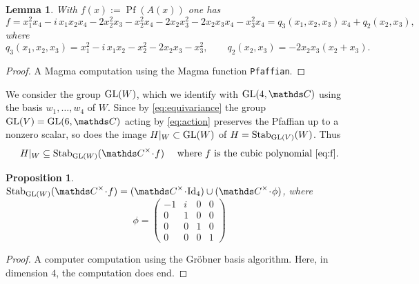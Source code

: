 \documentclass[11pt]{amsart}
\theoremstyle{plain}
\newtheorem{proposition}[theorem]{Proposition}
\newtheorem{lemma}[theorem]{Lemma}
\theoremstyle{definition}
\newcommand{\C}{{\mathds C}}
\newcommand{\GL}{{\rm GL}}
\newcommand{\Stab}{{\rm Stab}}
\newcommand{\Id}{{\rm Id}}
\newcommand{\PP}{\mathbb{P}}
\newcommand{\Pf}{\operatorname{Pf}}
\newcommand{\scdot}{\!\cdot\!}
\begin{document}
\begin{lemma}\label{lem:cubic}
With $f(x):=\Pf(A(x))$ one has
\begin{equation}\label{eq:f}
f=x_1^2x_4-i\,x_1x_2x_4-2x_2^2x_3-x_2^2x_4-2x_2x_3^2-2x_2x_3x_4-x_3^2x_4
=q_3(x_1,x_2,x_3)\,x_4+q_2(x_2,x_3),
\end{equation}
where
\begin{equation}\label{eq:qc}
q_3(x_1,x_2,x_3)=x_1^2-i\,x_1x_2-x_2^2-2x_2x_3-x_3^2,\qquad
q_2(x_2,x_3)=-2x_2x_3(x_2+x_3).
\end{equation}
\end{lemma}

\begin{proof}
A Magma computation using the Magma function {\tt Pfaffian}.
\end{proof}

We consider the group $\GL(W)$, which we identify with $\GL(4,\C)$
using the basis $w_1,\dots,w_4$ of $W$.
Since by \eqref{eq:equivariance} the group $\GL(V)=\GL(6,\C)$
acting by \eqref{eq:action} preserves the Pfaffian up to a nonzero scalar,
so does the image $H|_W\subset \GL(W)$  of $H=\Stab_{\GL(V)}(W)$.
Thus
\begin{equation}\label{e:H|_W}
H|_W\subseteq\Stab_{\GL(W)}(\C^\times\scdot f) \quad\ \text{where $f$ is the cubic polynomial \eqref{eq:f}.}
\end{equation}

\begin{proposition}\label{p:Stab(f)}
$\Stab_{\GL(W)}(\C^\times\scdot f)=(\C^\times\scdot\Id_4)\cup(\C^\times\scdot \phi)$,
where
\begin{equation*}
\phi =
\begin{pmatrix}
-1 &i&0&0\\
0&1&0&0\\
0&0&1&0\\
0&0&0&1
\end{pmatrix}
\end{equation*}
\end{proposition}

\begin{proof}
A computer computation using the Gr\"obner basis algorithm.
Here, in dimension $4$, the computation does end.
\end{proof}

\end{document}
